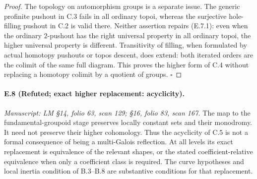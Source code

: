 \begin{proof}
The topology on automorphism groups is a separate issue. The generic profinite pushout in C.3 fails in all ordinary topoi, whereas the surjective hole-filling pushout in C.2 is valid there. Neither assertion repairs (E.7.1): even when the ordinary $2$-pushout has the right universal property in all ordinary topoi, the higher universal property is different. Transitivity of filling, when formulated by actual homotopy pushouts or topos descent, does extend: both iterated orders are the colimit of the same full diagram. This proves the higher form of C.4 without replacing a homotopy colimit by a quotient of groups. \hfill$\square$
\end{proof}

\paragraph{E.8 (Refuted; exact higher replacement: acyclicity).}
\textit{Manuscript: LM \S14, folio 63, scan 129; \S16, folio 83, scan 167.}
The map to the fundamental-groupoid stage preserves locally constant sets and their monodromy. It need not preserve their higher cohomology. Thus the acyclicity of C.5 is not a formal consequence of being a multi-Galois reflection. At all levels its exact replacement is equivalence of the relevant shapes, or the stated coefficient-relative equivalence when only a coefficient class is required. The curve hypotheses and local inertia condition of B.3--B.8 are substantive conditions for that replacement.
